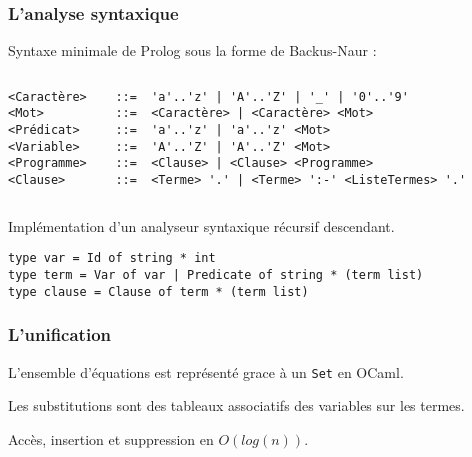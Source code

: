 \documentclass[aspectratio=43]{beamer}
\begin{document}
\begin{frame}[fragile]
  \frametitle{L'analyse syntaxique}

Syntaxe minimale de Prolog sous la forme de Backus-Naur :
\begin{columns}
\column{\dimexpr\paperwidth-60pt}
\begin{Verbatim}[fontsize=\footnotesize]
<Caractère>    ::=  'a'..'z' | 'A'..'Z' | '_' | '0'..'9'
<Mot>          ::=  <Caractère> | <Caractère> <Mot>
<Prédicat>     ::=  'a'..'z' | 'a'..'z' <Mot>
<Variable>     ::=  'A'..'Z' | 'A'..'Z' <Mot>
<Programme>    ::=  <Clause> | <Clause> <Programme>
<Clause>       ::=  <Terme> '.' | <Terme> ':-' <ListeTermes> '.'
\end{Verbatim}
\end{columns}

\vspace{1em}

Implémentation d'un analyseur syntaxique récursif descendant.

\vspace{1em}

\begin{verbatim}
type var = Id of string * int
type term = Var of var | Predicate of string * (term list)
type clause = Clause of term * (term list)
\end{verbatim}

\end{frame}

\begin{frame}[fragile]
  \frametitle{L'unification}
  L'ensemble d'équations est représenté grace à un \texttt{Set}  en OCaml.

  \vspace{1em}

  Les substitutions sont des tableaux associatifs des variables sur les termes.

  \vspace{1em}

  Accès, insertion et suppression en $O(log(n))$.
\end{frame}
\end{document}
